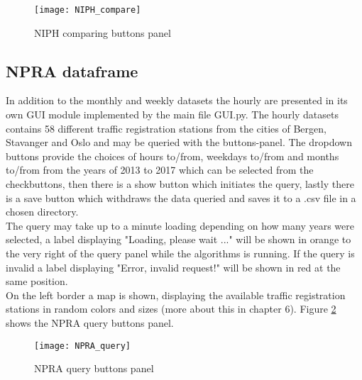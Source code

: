 \begin{figure}[ht]
\texttt{[image: NIPH\_compare]}
\centering
\caption{NIPH comparing buttons panel}
\label{fig:NIPH_compare}
\end{figure}

\newpage

\subsection{NPRA dataframe}
In addition to the monthly and weekly datasets the hourly are presented in its own GUI module implemented by the main file GUI.py. The hourly datasets contains 58 different traffic registration stations from the cities of Bergen, Stavanger and Oslo and may be queried with the buttons-panel. The dropdown buttons provide the choices of hours to/from, weekdays to/from and months to/from from the years of 2013 to 2017 which can be selected from the checkbuttons, then there is a show button which initiates the query, lastly there is a save button which withdraws the data queried and saves it to a .csv file in a chosen directory.\\ The query may take up to a minute loading depending on how many years were selected, a label displaying "Loading, please wait ..." will be shown in orange to the very right of the query panel while the algorithms is running. If the query is invalid a label displaying "Error, invalid request!" will be shown in red at the same position. \\
On the left border a map is shown, displaying the available traffic registration stations in random colors and sizes (more about this in chapter 6). Figure \ref{fig:NPRA_query} shows the NPRA query buttons panel.

\begin{figure}[ht]
\texttt{[image: NPRA\_query]}
\centering
\caption{NPRA query buttons panel}
\label{fig:NPRA_query}
\end{figure}




